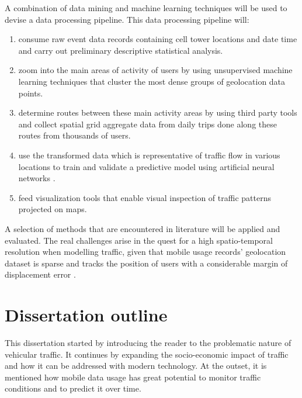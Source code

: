 \documentclass[12pt, a4paper]{report}
\theoremstyle{definition}
\theoremstyle{definition}%
\theoremstyle{definition}%
\theoremstyle{definition}%
\theoremstyle{definition}%
\theoremstyle{definition}%
\begin{document}
A combination of data mining and machine learning techniques will be used to devise a data processing pipeline. This data processing pipeline will:

\begin{enumerate}
 \item consume raw event data records containing cell tower locations and date time and carry out preliminary descriptive statistical analysis. \label{objective:01}
 
 \item zoom into the main areas of activity of users by using unsupervised machine learning techniques that cluster the most dense groups of geolocation data points. \label{objective:02}
 
 \item  determine routes between these main activity areas by using third party tools and collect spatial grid aggregate data from daily trips done along these routes from thousands of users. \label{objective:03}
 
 \item use the transformed data which is representative of traffic flow in various locations to train and validate a predictive model using artificial neural networks \cite{Calabrese2013,Toole2015,Hoteit2014,Alexander2015}.  \label{objective:04}
 
 \item feed visualization tools that enable visual inspection of traffic patterns projected on maps. \label{objective:05}

\end{enumerate}

A selection of methods that are encountered in literature will be applied and evaluated. The real challenges arise in the quest for a high spatio-temporal resolution when modelling traffic, given that mobile usage records' geolocation dataset is sparse and tracks the position of users with a considerable margin of displacement error \cite{Hoteit2014,Gonzalez2008}.



\section{Dissertation outline} \label{section:introduction:dissertation_outline}
This dissertation started by introducing the reader to the problematic nature of vehicular traffic. It continues by expanding the socio-economic impact of traffic and how it can be addressed with modern technology. At the outset, it is mentioned how mobile data usage has great potential to monitor traffic conditions and to predict it over time.
\end{document}
